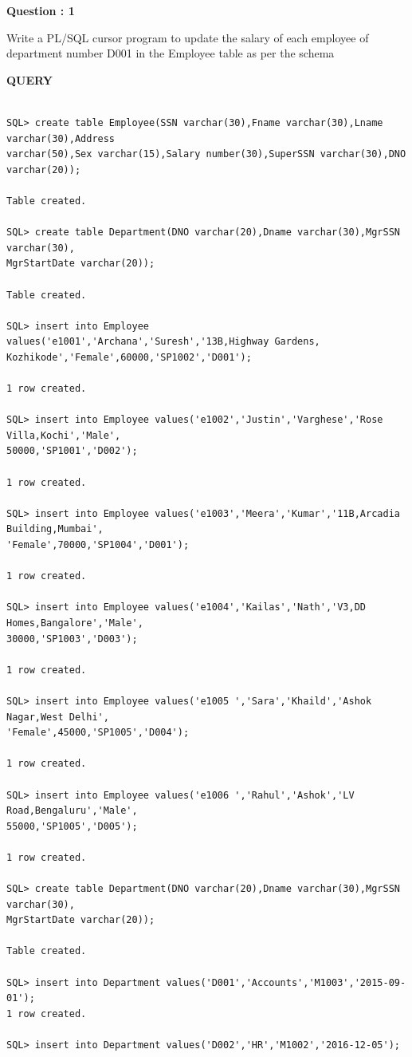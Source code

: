 \documentclass[a4paper,12pt]{report}
\begin{document}
\begin{flushleft}
    \textbf{Question : 1}
\end{flushleft}
Write a PL/SQL cursor program to update the salary of each employee of department number D001 in the Employee table as per the schema
\begin{flushleft}
\textbf{QUERY }
\end{flushleft}
 \begin{verbatim}

SQL> create table Employee(SSN varchar(30),Fname varchar(30),Lname varchar(30),Address
varchar(50),Sex varchar(15),Salary number(30),SuperSSN varchar(30),DNO varchar(20));

Table created.

SQL> create table Department(DNO varchar(20),Dname varchar(30),MgrSSN varchar(30),
MgrStartDate varchar(20));

Table created.

SQL> insert into Employee values('e1001','Archana','Suresh','13B,Highway Gardens,
Kozhikode','Female',60000,'SP1002','D001');

1 row created.

SQL> insert into Employee values('e1002','Justin','Varghese','Rose Villa,Kochi','Male',
50000,'SP1001','D002');

1 row created.

SQL> insert into Employee values('e1003','Meera','Kumar','11B,Arcadia Building,Mumbai',
'Female',70000,'SP1004','D001');

1 row created.

SQL> insert into Employee values('e1004','Kailas','Nath','V3,DD Homes,Bangalore','Male',
30000,'SP1003','D003');

1 row created.

SQL> insert into Employee values('e1005 ','Sara','Khaild','Ashok Nagar,West Delhi',
'Female',45000,'SP1005','D004');

1 row created.

SQL> insert into Employee values('e1006 ','Rahul','Ashok','LV Road,Bengaluru','Male',
55000,'SP1005','D005');

1 row created.

SQL> create table Department(DNO varchar(20),Dname varchar(30),MgrSSN varchar(30),
MgrStartDate varchar(20));

Table created.

SQL> insert into Department values('D001','Accounts','M1003','2015-09-01');
1 row created.

SQL> insert into Department values('D002','HR','M1002','2016-12-05');


\end{verbatim}
\end{document}
